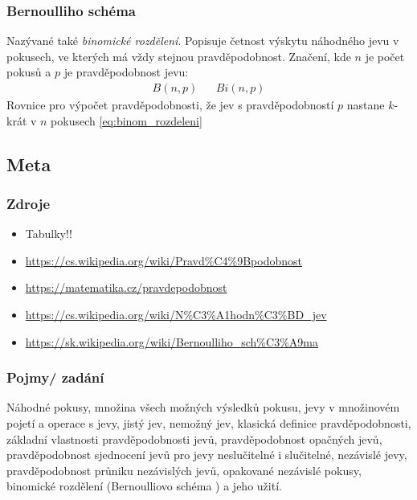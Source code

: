\documentclass[12pt]{article}
\begin{document}
\subsubsection{Bernoulliho schéma}
Nazývané také \emph{binomické rozdělení}. Popisuje četnost výskytu náhodného jevu v  pokusech, ve kterých má vždy stejnou pravděpodobnost. Značení, kde $n$ je počet pokusů a $p$ je pravděpodobnost jevu:
\begin{align}
B(n,p) && Bi(n,p)
\end{align}
Rovnice pro výpočet pravděpodobnosti, že jev s pravděpodobností $p$ nastane $k$-krát v $n$ pokusech \eqref{eq:binom_rozdeleni}
\subsection{Meta}
\subsubsection{Zdroje}
\begin{itemize}
\item Tabulky!!
\item \url{https://cs.wikipedia.org/wiki/Pravd\%C4\%9Bpodobnost}
\item \url{https://matematika.cz/pravdepodobnost}
\item \url{https://cs.wikipedia.org/wiki/N\%C3\%A1hodn\%C3\%BD_jev}
\item \url{https://sk.wikipedia.org/wiki/Bernoulliho_sch\%C3\%A9ma} %
\end{itemize}
\subsubsection{Pojmy/ zadání}
Náhodné pokusy, množina všech možných výsledků pokusu, jevy v množinovém pojetí a operace s jevy, jistý jev, nemožný jev, klasická definice pravděpodobnosti, základní vlastnosti pravděpodobnosti jevů, pravděpodobnost opačných jevů, pravděpodobnost sjednocení jevů pro jevy neslučitelné i slučitelné, nezávislé jevy, pravděpodobnost průniku nezávislých jevů, opakované nezávislé pokusy, binomické rozdělení (Bernoulliovo schéma ) a jeho užití.
\end{document}
